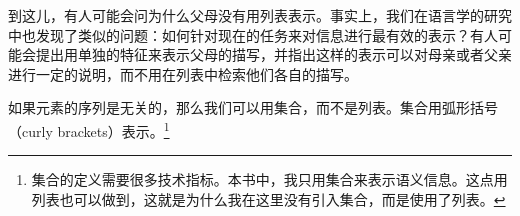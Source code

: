 \ea
{}
\z
到这儿，有人可能会问为什么父母没有用列表表示。事实上，我们在语言学的研究中也发现了类似的问题：如何针对现在的任务来对信息进行最有效的表示？有人可能会提出用单独的特征来表示父母的描写，并指出这样的表示可以对母亲或者父亲进行一定的说明，而不用在列表中检索他们各自的描写。

如果元素的序列是无关的，那么我们可以用集合，而不是列表。集合用弧形括号（curly brackets）表示。\footnote{%
集合的定义需要很多技术指标。本书中，我只用集合来表示语义信息。这点用列表也可以做到，这就是为什么我在这里没有引入集合，而是使用了列表。
}

